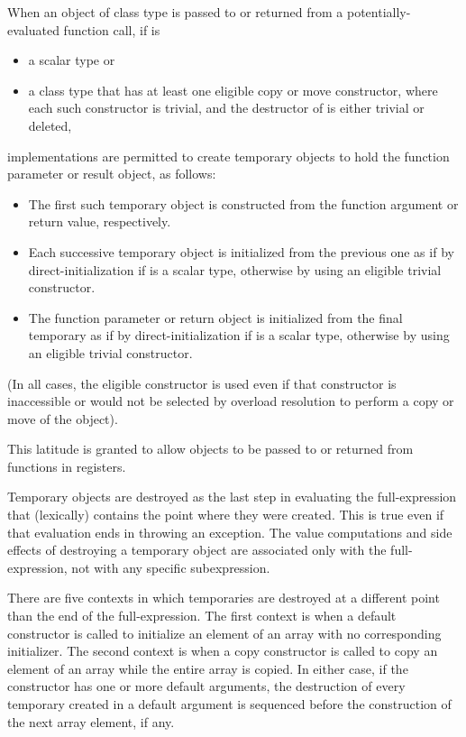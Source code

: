 \pnum
When an object of class type 
is passed to or returned from a potentially-evaluated function call,
if  is
\begin{itemize}
\item
a scalar type or
\item
a class type that
has at least one eligible copy or move constructor,
where each such constructor is trivial,
and the destructor of  is either trivial or deleted,
\end{itemize}
implementations are permitted
to create temporary objects
to hold the function parameter or result object,
as follows:
\begin{itemize}
\item
The first such temporary object
is constructed from the function argument or return value, respectively.
\item
Each successive temporary object
is initialized from the previous one
as if by direct-initialization if  is a scalar type,
otherwise by using an eligible trivial constructor.
\item
The function parameter or return object is initialized
from the final temporary
as if by direct-initialization if  is a scalar type,
otherwise by using an eligible trivial constructor.
\end{itemize}
(In all cases, the eligible constructor is used
even if that constructor is inaccessible
or would not be selected by overload resolution
to perform a copy or move of the object).
\begin{note}
This latitude is granted to allow objects
to be passed to or returned from functions in registers.
\end{note}

\pnum
{}%
%
%
Temporary objects are destroyed as the last step
in evaluating
the full-expression
that (lexically) contains the point where
they were created.
This is true even if that evaluation ends in throwing an exception.
The
%
value computations and
%
side effects of destroying a temporary object
are associated only with the full-expression, not with any specific
subexpression.

\pnum
{}%
%
There are five contexts in which temporaries are destroyed at a different
point than the end of the full-expression.
The first context is when a default constructor is called to initialize
an element of an array with no corresponding initializer.
The second context is when a copy constructor is called to copy an element of
an array while the entire array is copied.
In either case, if the constructor has one or more default arguments,
the destruction of every temporary created in a default argument is
sequenced before the construction of the next array element, if any.

